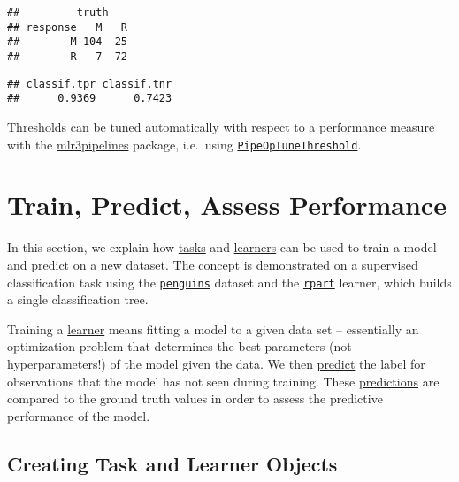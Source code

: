 \documentclass[
]{scrbook}
\newenvironment{Shaded}{\begin{snugshade}}{\end{snugshade}}
\newcommand{\FunctionTok}[1]{\textcolor[rgb]{0.00,0.00,0.00}{#1}}
\newcommand{\NormalTok}[1]{#1}
\newcommand{\SpecialCharTok}[1]{\textcolor[rgb]{0.00,0.00,0.00}{#1}}
\renewenvironment{Shaded} {\begin{snugshade}\small} {\end{snugshade}}
\begin{document}
\begin{verbatim}
##         truth
## response   M   R
##        M 104  25
##        R   7  72
\end{verbatim}

\begin{Shaded}
\end{Shaded}

\begin{verbatim}
## classif.tpr classif.tnr 
##      0.9369      0.7423
\end{verbatim}

Thresholds can be tuned automatically with respect to a performance measure with the \href{https://mlr3pipelines.mlr-org.com}{mlr3pipelines} package, i.e.~using \href{https://mlr3pipelines.mlr-org.com/reference/mlr_pipeops_tunethreshold.html}{\texttt{PipeOpTuneThreshold}}.

\hypertarget{train-predict}{%
\section{Train, Predict, Assess Performance}\label{train-predict}}

In this section, we explain how \protect\hyperlink{tasks}{tasks} and \protect\hyperlink{learners}{learners} can be used to train a model and predict on a new dataset.
The concept is demonstrated on a supervised classification task using the \href{https://mlr3.mlr-org.com/reference/mlr_tasks_penguins.html}{\texttt{penguins}} dataset and the \href{https://mlr3.mlr-org.com/reference/mlr_learners_classif.rpart.html}{\texttt{rpart}} learner, which builds a single classification tree.

Training a \protect\hyperlink{learners}{learner} means fitting a model to a given data set -- essentially an optimization problem that determines the best parameters (not hyperparameters!) of the model given the data.
We then \protect\hyperlink{predicting}{predict} the label for observations that the model has not seen during training.
These \protect\hyperlink{predicting}{predictions} are compared to the ground truth values in order to assess the predictive performance of the model.

\hypertarget{train-predict-objects}{%
\subsection{Creating Task and Learner Objects}\label{train-predict-objects}}
\end{document}
